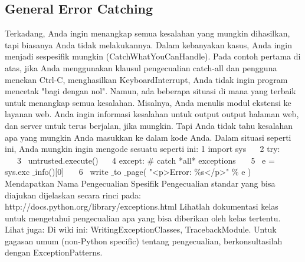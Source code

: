 \subsection{General Error Catching}
Terkadang, Anda ingin menangkap semua kesalahan yang mungkin dihasilkan, tapi biasanya Anda tidak melakukannya. Dalam kebanyakan kasus, Anda ingin menjadi sespesifik mungkin (CatchWhatYouCanHandle). Pada contoh pertama di atas, jika Anda menggunakan klausul pengecualian catch-all dan pengguna menekan Ctrl-C, menghasilkan KeyboardInterrupt, Anda tidak ingin program mencetak "bagi dengan nol".
Namun, ada beberapa situasi di mana yang terbaik untuk menangkap semua kesalahan.
Misalnya, Anda menulis modul ekstensi ke layanan web. Anda ingin informasi kesalahan untuk output output halaman web, dan server untuk terus berjalan, jika mungkin. Tapi Anda tidak tahu kesalahan apa yang mungkin Anda masukkan ke dalam kode Anda. Dalam situasi seperti ini, Anda mungkin ingin mengode sesuatu seperti ini: 
 1 import sys
~~ 2 try: 
~~~3~  untrusted.execute()
~~ 4 except:  $  \#  $ catch *all* exceptions 
~~~5~  e = sys.exc $  \_  $info()[0] 
~~~6~  write $  \_  $to $  \_  $page( "<p>Error:  $  \%  $s</p>"  $  \%  $ e )
Mendapatkan Nama Pengecualian Spesifik
Pengecualian standar yang bisa diajukan dijelaskan secara rinci pada:
~~~ http://docs.python.org/library/exceptions.html
Lihatlah dokumentasi kelas untuk mengetahui pengecualian apa yang bisa diberikan oleh kelas tertentu.
Lihat juga:
Di wiki ini: WritingExceptionClasses, TracebackModule.
Untuk gagasan umum (non-Python specific) tentang pengecualian, berkonsultasilah dengan ExceptionPatterns.


